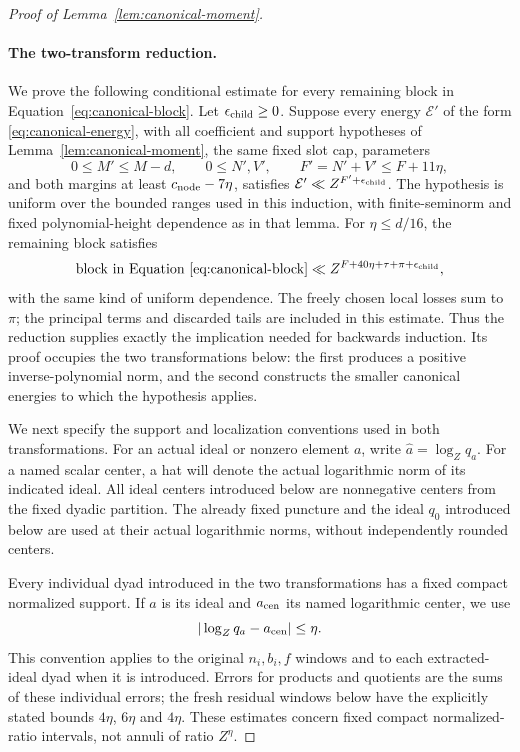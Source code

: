 \documentclass[12pt]{article}
\begin{document}
\begin{proof}[Proof of Lemma~\ref{lem:canonical-moment}]
\paragraph{The two-transform reduction.}
We prove the following conditional estimate for every remaining block
in Equation~\eqref{eq:canonical-block}. Let \(\epsilon_{\rm child}\ge0\).
Suppose every energy \(\mathcal E'\) of the form
\eqref{eq:canonical-energy}, with all coefficient and support hypotheses
of Lemma~\ref{lem:canonical-moment}, the same fixed slot cap, parameters
\[
 0\le M'\le M-d,\qquad 0\le N',V',\qquad F'=N'+V'\le F+11\eta,
\]
and both margins at least \(c_{\rm node}-7\eta\), satisfies
\(\mathcal E'\ll Z^{F'+\epsilon_{\rm child}}\).
The hypothesis is uniform over the bounded ranges used in this induction,
with finite-seminorm and fixed polynomial-height dependence as in that
lemma. For
\(\eta\le d/16\), the remaining block satisfies
\begin{equation}\label{eq:canonical-reduction-contract}
 \text{block in Equation~\eqref{eq:canonical-block}}
 \ll Z^{F+40\eta+\tau+\pi+\epsilon_{\rm child}},
\end{equation}
with the same kind of uniform dependence. The freely chosen local losses
sum to \(\pi\); the principal terms and discarded tails are included
in this estimate. Thus the reduction supplies exactly the implication
needed for backwards induction. Its proof occupies the two transformations
below: the first produces a positive inverse-polynomial norm, and the second
constructs the smaller canonical energies to which the hypothesis applies.

We next specify the support and localization conventions used in both
transformations.  For an actual ideal or nonzero element \(a\), write
\(\widehat a=\log_Zq_a\).  For a named scalar center, a hat will denote
the actual logarithmic norm of its indicated ideal.  All ideal centers
introduced below are nonnegative centers from the fixed dyadic partition.
The already fixed puncture and the ideal \(q_0\) introduced below are used
at their actual logarithmic norms, without independently rounded centers.

Every individual dyad introduced in the two transformations has a fixed
compact normalized support. If \(a\) is its ideal and \(a_{\rm cen}\)
its named logarithmic center, we use
\begin{equation}\label{eq:inverse-ratio-bounds}
 |\log_Zq_a-a_{\rm cen}|\le\eta.
\end{equation}
This convention applies to the original \(n_i,b_i,f\) windows and to
each extracted-ideal dyad when it is introduced. Errors for products
and quotients are the sums of these individual errors; the fresh residual
windows below have the explicitly stated bounds \(4\eta\), \(6\eta\)
and \(4\eta\). These estimates concern fixed compact normalized-ratio
intervals, not annuli of ratio \(Z^\eta\).


\end{proof}
\end{document}
